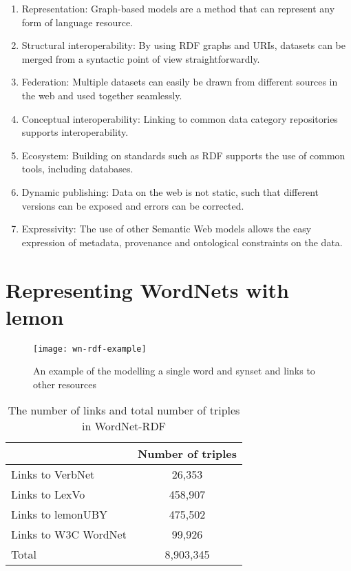 \documentclass[10pt, a4paper]{article}
\begin{document}
\begin{enumerate}
    \item Representation: Graph-based models are a method that can represent any
        form of language resource.
    \item Structural interoperability: By using RDF graphs and URIs, datasets can
        be merged from a syntactic point of view straightforwardly.
    \item Federation: Multiple datasets can easily be drawn from different
        sources in the web and used together seamlessly.
    \item Conceptual interoperability: Linking to common data category
        repositories supports interoperability.
        \item Ecosystem: Building on standards such as RDF supports the use of common
        tools, including databases.
    \item Dynamic publishing: Data on the web is not static, such that different versions can be exposed and errors can be corrected.   
    \item Expressivity: The use of other Semantic Web models allows the easy
        expression of metadata, provenance and ontological constraints on the
        data.
\end{enumerate}

\section{Representing WordNets with lemon}

\begin{figure}
    \texttt{[image: wn-rdf-example]}
    \caption{An example of the modelling a single word and synset and links to
        other resources\label{modelling_example}}
\end{figure}



\begin{table}
  \begin{tabular}{p{50mm}|c}
     & Number of triples \\
    \hline
    Links to VerbNet & 26,353 \\
    Links to LexVo & 458,907 \\
    Links to lemonUBY & 475,502 \\
    Links to W3C WordNet & 99,926 \\
    \hline
    Total & 8,903,345 \\
  \end{tabular}
  \caption{The number of links and total number of triples in
      WordNet-RDF\label{triple_counts}}
\end{table}
\end{document}
